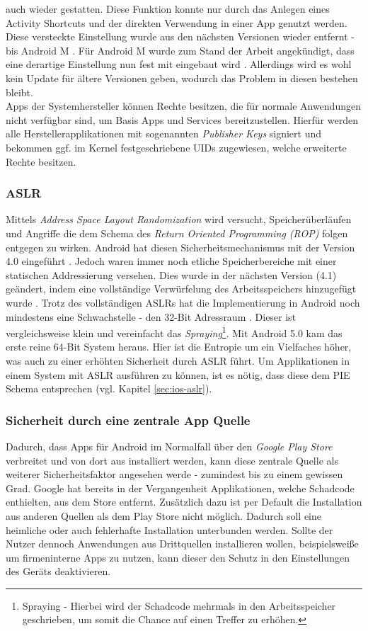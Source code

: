 	auch wieder gestatten. Diese Funktion konnte nur durch das Anlegen
	eines Activity Shortcuts und der direkten Verwendung in einer App genutzt
	werden. Diese versteckte Einstellung wurde aus den nächsten Versionen wieder
	entfernt - bis Android M \cite{HiddenActivity}. Für Android M wurde
	zum Stand der Arbeit angekündigt, dass eine derartige Einstellung nun fest mit
	eingebaut wird \cite{AndroidMPermission}. Allerdings wird es wohl kein
	Update für ältere Versionen geben, wodurch das Problem in diesen bestehen
	bleibt.\\
	Apps der Systemhersteller können Rechte besitzen, die für normale Anwendungen
	nicht verfügbar sind, um Basis Apps und Services bereitzustellen. Hierfür
	werden alle Herstellerapplikationen mit sogenannten \textit{Publisher Keys}
	signiert und bekommen ggf. im Kernel festgeschriebene UIDs zugewiesen, welche
	erweiterte Rechte besitzen.
	
	\subsubsection{ASLR}\label{sec:android-aslr}
	Mittels \textit{Address Space Layout Randomization} wird versucht,
	Speicherüberläufen und Angriffe die dem Schema des \textit{Return Oriented
	Programming (ROP)} folgen entgegen zu wirken. Android hat diesen
	Sicherheitsmechanismus mit der Version 4.0 eingeführt \cite{AslrAndroid}.
	Jedoch waren immer noch etliche Speicherbereiche mit einer statischen
	Addressierung versehen. Dies wurde in der nächsten Version (4.1) geändert,
	indem eine vollständige Verwürfelung des Arbeitsspeichers hinzugefügt wurde
	\cite{BetterAslrAndroid}. Trotz des vollständigen ASLRs hat die
	Implementierung in Android noch mindestens eine Schwachstelle - den 32-Bit
	Adressraum \cite{AslrAndroid32}. Dieser ist vergleichsweise klein und
	vereinfacht das \textit{Spraying}\footnote{Spraying - Hierbei wird der
	Schadcode mehrmals in den Arbeitsspeicher geschrieben, um somit die Chance auf
	einen Treffer zu erhöhen.}. Mit Android 5.0 kam das erste reine 64-Bit System
	heraus. Hier ist die Entropie um ein Vielfaches höher, was auch zu einer
	erhöhten Sicherheit durch ASLR führt. Um Applikationen in einem System mit
	ASLR ausführen zu können, ist es nötig, dass diese dem PIE Schema entsprechen
	(vgl. Kapitel \ref{sec:ios-aslr}).
	
	
	\subsubsection{Sicherheit durch eine zentrale App Quelle}
	Dadurch, dass Apps für Android im Normalfall über den \textit{Google Play
	Store} verbreitet und von dort aus installiert werden, kann diese zentrale
	Quelle als weiterer Sicherheitsfaktor angesehen werde - zumindest bis zu einem
	gewissen Grad. Google hat bereits in der Vergangenheit Applikationen, welche
	Schadcode enthielten, aus dem Store entfernt. Zusätzlich dazu ist per Default
	die Installation aus anderen Quellen als dem Play Store nicht möglich. Dadurch
	soll eine heimliche oder auch fehlerhafte Installation unterbunden werden.
	Sollte der Nutzer dennoch Anwendungen aus Drittquellen installieren wollen,
	beispielsweiße um firmeninterne Apps zu nutzen, kann dieser den
	Schutz in den Einstellungen des Geräts deaktivieren.
